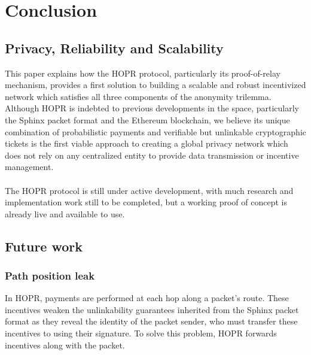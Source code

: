 \section{Conclusion}

\subsection{Privacy, Reliability and Scalability}

This paper explains how the HOPR protocol, particularly its proof-of-relay mechanism, provides a first solution to building a scalable and robust incentivized network which satisfies all three components of the anonymity trilemma. Although HOPR is indebted to previous developments in the space, particularly the Sphinx packet format and the Ethereum blockchain, we believe its unique combination of probabilistic payments and verifiable but unlinkable cryptographic tickets is the first viable approach to creating a global privacy network which does not rely on any centralized entity to provide data transmission or incentive management.
\\~\\The HOPR protocol is still under active development, with much research and implementation work still to be completed, but a working proof of concept is already live and available to use. 

\subsection{Future work}

\subsubsection{Path position leak}

In HOPR, payments are performed at each hop along a packet’s route. These
incentives weaken the unlinkability guarantees inherited from the Sphinx packet
format \cite{sphinxpaper} as they reveal the identity of the packet sender, who
must transfer these incentives to using their signature. To solve this
problem, HOPR forwards incentives along with the packet.

